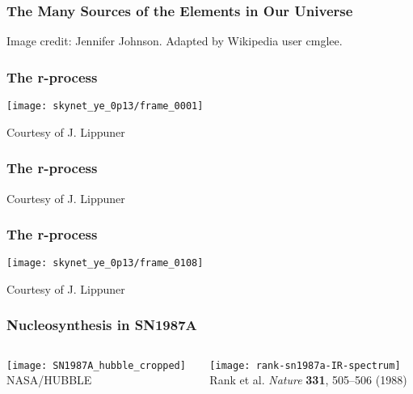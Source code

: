 \documentclass[]{beamer}
\begin{document}
\begin{frame}
  \frametitle{The Many Sources of the Elements in Our Universe}
  \begin{center}
    \end{center}
    Image credit: Jennifer Johnson. Adapted by Wikipedia user cmglee.
\end{frame}

\begin{frame}
 \frametitle{The r-process}
 \begin{center}
  \texttt{[image: skynet\_ye\_0p13/frame\_0001]}
 \end{center}
 Courtesy of J. Lippuner
\end{frame}

\begin{frame}
 \frametitle{The r-process}
 \begin{center}
 \end{center}
 Courtesy of J. Lippuner
\end{frame}

\begin{frame}
 \frametitle{The r-process}
 \begin{center}
   \texttt{[image: skynet\_ye\_0p13/frame\_0108]}
 \end{center}
 Courtesy of J. Lippuner
\end{frame}

\begin{frame}
  \frametitle{Nucleosynthesis in SN1987A}
  \begin{columns}
    \begin{column}{4cm}
      \begin{center}
        \texttt{[image: SN1987A\_hubble\_cropped]}\\
        NASA/HUBBLE
      \end{center}
    \end{column}
    \begin{column}{8cm}
      \begin{center}
        \texttt{[image: rank-sn1987a-IR-spectrum]}\\
        Rank et al. \textit{Nature} \textbf{331}, 505–506 (1988)
      \end{center}
    \end{column}
  \end{columns}
\end{frame}
\end{document}
